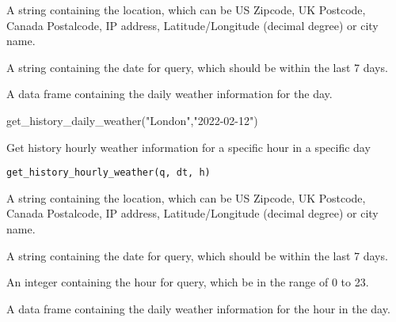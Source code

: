 \documentclass[a4paper]{book}
\begin{document}
%
\begin{Arguments}
\begin{ldescription}
\item[\code{q}] A string containing the location, which can be US Zipcode, UK Postcode, Canada Postalcode, IP address, Latitude/Longitude (decimal degree) or city name.

\item[\code{dt}] A string containing the date for query, which should be within the last 7 days.
\end{ldescription}
\end{Arguments}
%
\begin{Value}
A data frame containing the daily weather information for the day.
\end{Value}
%
\begin{Examples}
\begin{ExampleCode}
get_history_daily_weather("London","2022-02-12")
\end{ExampleCode}
\end{Examples}
%
\begin{Description}\relax
Get history hourly weather information for a specific hour in a specific day
\end{Description}
%
\begin{Usage}
\begin{verbatim}
get_history_hourly_weather(q, dt, h)
\end{verbatim}
\end{Usage}
%
\begin{Arguments}
\begin{ldescription}
\item[\code{q}] A string containing the location, which can be US Zipcode, UK Postcode, Canada Postalcode, IP address, Latitude/Longitude (decimal degree) or city name.

\item[\code{dt}] A string containing the date for query, which should be within the last 7 days.

\item[\code{h}] An integer containing the hour for query, which be in the range of 0 to 23.
\end{ldescription}
\end{Arguments}
%
\begin{Value}
A data frame containing the daily weather information for the hour in the day.
\end{Value}
\end{document}
